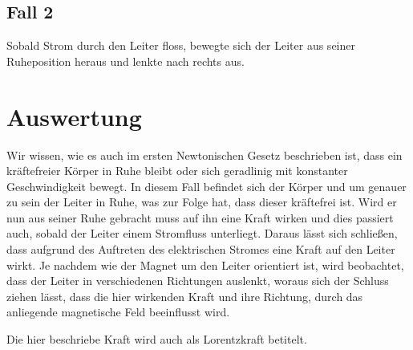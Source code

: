 \documentclass[
	fontsize=11pt,
	paper=a4,
	pagesize=auto,
	parskip=half,
	titlepage=on,
	ngerman
]{scrartcl}
\begin{document}
\subsection{Fall 2}

Sobald Strom durch den Leiter floss, bewegte sich der Leiter aus seiner Ruheposition heraus und lenkte nach rechts aus.

\section{Auswertung}

Wir wissen, wie es auch im ersten Newtonischen Gesetz beschrieben ist, dass ein kräftefreier Körper in Ruhe bleibt oder sich geradlinig mit konstanter Geschwindigkeit bewegt. In diesem Fall befindet sich der Körper und um genauer zu sein der Leiter in Ruhe, was zur Folge hat, dass dieser kräftefrei ist. Wird er nun aus seiner Ruhe gebracht muss auf ihn eine Kraft wirken und dies passiert auch, sobald der Leiter einem Stromfluss unterliegt. Daraus lässt sich schließen, dass aufgrund des Auftreten des elektrischen Stromes eine Kraft auf den Leiter wirkt. Je nachdem wie der Magnet um den Leiter orientiert ist, wird beobachtet, dass der Leiter in verschiedenen Richtungen auslenkt, woraus sich der Schluss ziehen lässt, dass die hier wirkenden Kraft und ihre Richtung, durch das anliegende magnetische Feld beeinflusst wird.

Die hier beschriebe Kraft wird auch als Lorentzkraft betitelt. 
\end{document}

